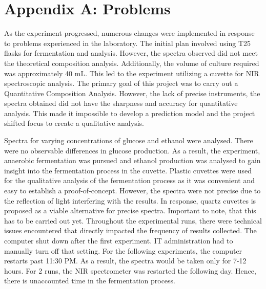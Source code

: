 \documentclass[12pt]{report}
\newcommand{\addappendix}[2]{
    \chapter*{Appendix #1: #2}
    \addcontentsline{toc}{section}{Appendix #1: #2}
}
\begin{document}

\newpage
\printbibliography %
\thispagestyle{empty}


\newpage
\appendix
\addappendix{A}{Problems}

As the experiment progressed, numerous changes were implemented in response to problems experienced in the laboratory. The initial plan involved using T25 flasks for fermentation and analysis. However, the spectra observed did not meet the theoretical composition analysis. Additionally, the volume of culture required was approximately 40 mL. This led to the experiment utilizing a cuvette for NIR spectroscopic analysis. 
The primary goal of this project was to carry out a Quantitative Composition Analysis. However, the lack of precise instruments, the spectra obtained did not have the sharpness and accuracy for quantitative analysis. This made it impossible to develop a prediction model and the project shifted focus to create a qualitative analysis.

Spectra for varying concentrations of glucose and ethanol were analysed. There were no observable differences in glucose production. As a result, the experiment, anaerobic fermentation was pursued and ethanol production was analysed to gain insight into the fermentation process in the cuvette. 
Plastic cuvettes were used for the qualitative analysis of the fermentation process as it was convenient and easy to establish a proof-of-concept. However, the spectra were not precise due to the reflection of light interfering with the results. In response, quartz cuvettes is proposed as a viable alternative for precise spectra. Important to note, that this has to be carried out yet. 
Throughout the experimental runs, there were technical issues encountered that directly impacted the frequency of results collected. The computer shut down after the first experiment. IT administration had to manually turn off that setting. For the following experiments, the computer restarts past 11:30 PM. As a result, the spectra would be taken only for 7-12 hours. For 2 runs, the NIR spectrometer was restarted the following day. Hence, there is unaccounted time in the fermentation process.
\end{document}
